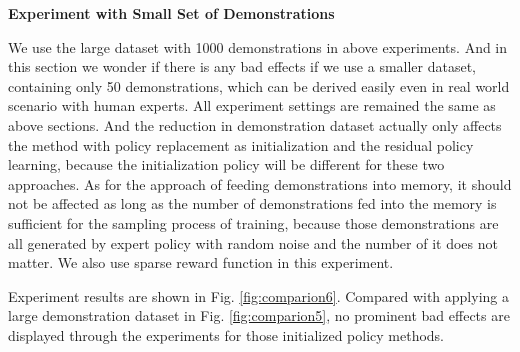 \documentclass{article}
\begin{document}
\textbf{Experiment with Small Set of Demonstrations}

We use the large dataset with 1000 demonstrations in above experiments. And in this section we wonder if there is any bad effects if we use a smaller dataset, containing only 50 demonstrations, which can be derived easily even in real world scenario with human experts. All experiment settings are remained the same as above sections. And the reduction in demonstration dataset actually only affects the method with policy replacement as initialization and the residual policy learning, because the initialization policy will be different for these two approaches. As for the approach of feeding demonstrations into memory, it should not be affected as long as the number of demonstrations fed into the memory is sufficient for the sampling process of training, because those demonstrations are all generated by expert policy with random noise and the number of it does not matter. We also use sparse reward function in this experiment.

Experiment results are shown in Fig. \ref{fig:comparion6}. Compared with applying a large demonstration dataset in Fig. \ref{fig:comparion5}, no prominent bad effects are displayed through the experiments for those initialized policy methods.
\end{document}
